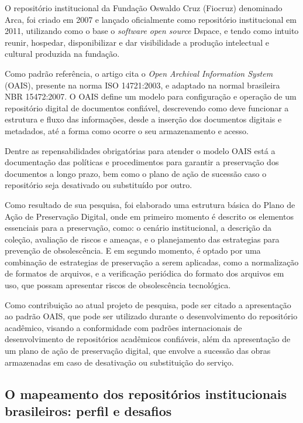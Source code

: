 O repositório institucional da Fundação Oswaldo Cruz (Fiocruz) denominado
Arca, foi criado em 2007 e lançado oficialmente como repositório institucional em 2011,
utilizando como o base o \emph{software open source} Dspace, e tendo como intuito
reunir, hospedar, disponibilizar e dar visibilidade a produção intelectual e cultural
produzida na fundação.

Como padrão referência, o artigo cita o \emph{Open Archival Information System}
(OAIS), presente na norma ISO 14721:2003, e adaptado na normal brasileira
NBR 15472:2007. O OAIS define um modelo para configuração e operação
de um repositório digital de documentos confiável, descrevendo como deve funcionar
a estrutura e fluxo das informações, desde a inserção dos documentos digitais e
metadados, até a forma como ocorre o seu armazenamento e acesso.

Dentre as repensabilidades obrigatórias para atender o modelo OAIS
está a documentação das políticas e procedimentos para garantir
a preservação dos documentos a longo prazo, bem como o plano de ação
de sucessão caso o repositório seja desativado ou substituído por outro.

Como resultado de sua pesquisa, foi elaborado uma estrutura básica
do Plano de Ação de Preservação Digital, onde em primeiro momento
é descrito os elementos essenciais para a preservação, como: o cenário
institucional, a descrição da coleção, avaliação de riscos e ameaças,
e o planejamento das estrategias para prevenção de obsolescência. E em
segundo momento, é optado por uma combinação de estrategias de preservação
a serem aplicadas, como a normalização de formatos de arquivos, e a verificação
periódica do formato dos arquivos em uso, que possam apresentar riscos
de obsolescência tecnológica.

Como contribuição ao atual projeto de pesquisa, pode ser citado a
apresentação ao padrão OAIS, que pode ser utilizado durante o desenvolvimento
do repositório acadêmico, visando a conformidade com padrões internacionais
de desenvolvimento de repositórios acadêmicos confiáveis, além da apresentação
de um plano de ação de preservação digital, que envolve a sucessão das obras
armazenadas em caso de desativação ou substituição do serviço.

\subsection{O mapeamento dos repositórios institucionais brasileiros: perfil e desafios}

